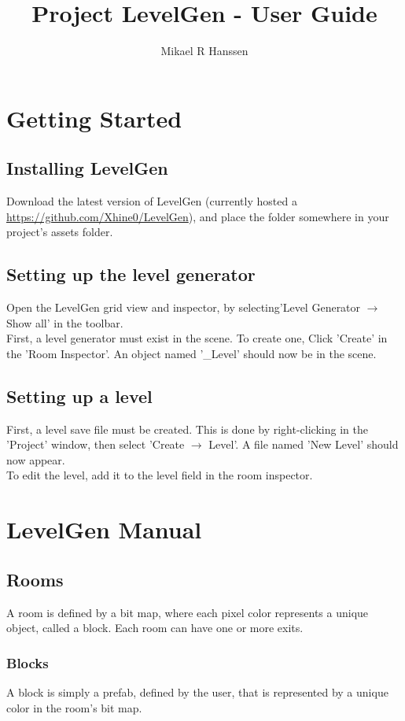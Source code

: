 \documentclass[a4paper]{article}
\begin{document}
	\title{Project LevelGen - User Guide}
	\author{Mikael R Hanssen}
	\maketitle
	
	\tableofcontents
	\newpage
	
	\section{Getting Started}
	\subsection{Installing LevelGen}
	Download the latest version of LevelGen (currently hosted a \url{https://github.com/Xhine0/LevelGen}), and place the folder somewhere in your project's assets folder.
	\subsection{Setting up the level generator}
	Open the LevelGen grid view and inspector, by selecting'Level Generator $\rightarrow$ Show all' in the toolbar. 
	\\First, a level generator must exist in the scene. To create one, Click 'Create' in the 'Room Inspector'. An object named '\_Level' should now be in the scene.
	\subsection{Setting up a level}
	First, a level save file must be created. This is done by right-clicking in the 'Project' window, then select 'Create $\rightarrow$ Level'. A file named 'New Level' should now appear. 
	\\ To edit the level, add it to the level field in the room inspector.
	
	\section{LevelGen Manual}
	\subsection{Rooms}
	A room is defined by a bit map, where each pixel color represents a unique object, called a block. Each room can have one or more exits.
	\subsubsection{Blocks}
	A block is simply a prefab, defined by the user, that is represented by a unique color in the room's bit map.
\end{document}
